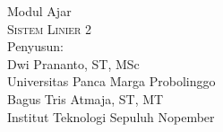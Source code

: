 \documentclass[12pt]{book}
\begin{document}
\begin{titlepage}
Modul Ajar\\
\textsc{\Huge Sistem Linier 2}\\[13cm]
Penyusun:\\
Dwi Prananto, ST, MSc\\
{\large
Universitas Panca Marga Probolinggo} \\
Bagus Tris Atmaja, ST, MT \\
{\large
Institut Teknologi Sepuluh Nopember\\}
\end{titlepage}
\tableofcontents{}\listoffigures






\end{document}
